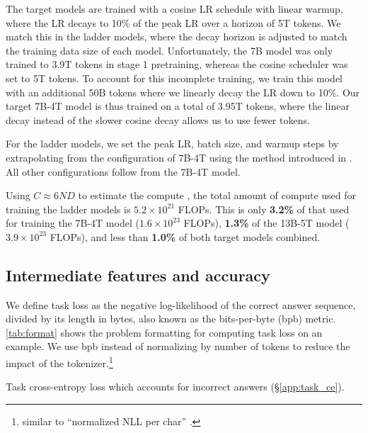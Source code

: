 The target models are trained with a cosine LR schedule with linear warmup, where the LR decays to 10\% of the peak LR over a horizon of 5T tokens.
We match this in the ladder models, where the decay horizon is adjusted to match the training data size of each model.
Unfortunately, the \basemodelname{} 7B model was only trained to 3.9T tokens in stage 1 pretraining, whereas the cosine scheduler was set to 5T tokens. 
To account for this incomplete training, we train this model with an additional 50B tokens where we linearly decay the LR down to 10\%.
Our target 7B-4T model is thus trained on a total of 3.95T tokens, where the linear decay instead of the slower cosine decay allows us to use fewer tokens.

For the ladder models, we set the peak LR, batch size, and warmup steps by extrapolating from the configuration of 7B-4T using the method introduced in \citet{Porian2024ResolvingDI}.
All other configurations follow from the 7B-4T model.

Using $C \approx 6 N D$ to estimate the compute \citep{Kaplan2020ScalingLF}, the total amount of compute used for training the ladder models is $5.2 \times 10^{21}$ FLOPs.
This is only \textbf{3.2\%} of that used for training the 7B-4T model ($1.6 \times 10^{23}$ FLOPs), \textbf{1.3\%} of the 13B-5T model ($3.9 \times 10^{23}$ FLOPs), and less than \textbf{1.0\%} of both target models combined.

\subsection{Intermediate features and accuracy}
\label{sec:task_setup}




We define task loss as the negative log-likelihood of the correct answer sequence, divided by its length in bytes, also known as the bits-per-byte (bpb) metric.
\autoref{tab:format} shows the problem formatting for computing task loss on an example.
We use bpb instead of normalizing by number of tokens to reduce the impact of the tokenizer.\footnote{similar to ``normalized NLL per char'' \citep{Dubey2024TheL3}.} 

Task cross-entropy loss which accounts for incorrect answers (\S\ref{app:task_ce}).

